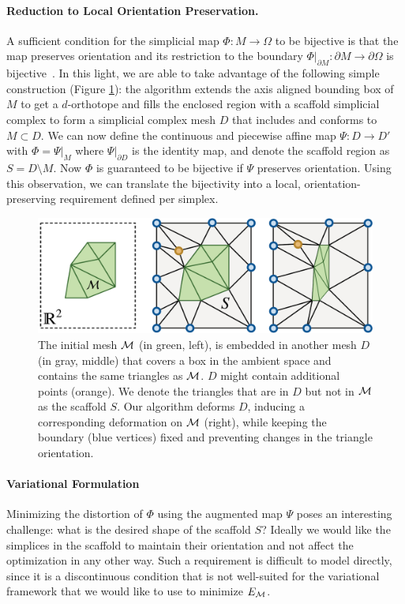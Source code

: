 \paragraph{Reduction to Local Orientation Preservation.}  A sufficient %
condition for the simplicial map 
$\Phi: M\rightarrow \Omega $ to be bijective is that the map preserves orientation and its restriction to the boundary $\Phi|_{\partial M} : \partial M \rightarrow \partial \Omega$ is bijective~\cite{Lipman:2013ArXiv}. In this light, we are able to take advantage of the following simple construction (Figure \ref{scaf:fig:construction}): the algorithm extends the axis aligned bounding box of $M$ to get a $d$-orthotope and fills the enclosed region with a scaffold simplicial complex to form a simplicial complex mesh $D$ that includes and conforms to $M \subset D$. We can now define the continuous and piecewise affine map $\Psi : D \rightarrow D'$ with $\Phi = \Psi |_{M}$ where $\Psi|_{\partial D}$ is the identity map, and denote the scaffold region as $S = D\setminus M$. Now $\Phi$ is guaranteed to be bijective if $\Psi$ preserves orientation. Using this observation, we can translate the bijectivity into a local, orientation-preserving requirement defined per simplex.

\begin{figure}[h!]
\centering
    \includegraphics[width = \columnwidth]{scaf-tex/figs/scaffold_illustration}
\caption{The initial mesh $\operatorname{\mathcal{M}}$ (in green, left), is embedded in another mesh $D$ (in gray, middle) that covers a box in the ambient space and contains the same triangles as $\operatorname{\mathcal{M}}$. $D$ might contain additional points (orange). We denote the triangles that are in $D$ but not in $\operatorname{\mathcal{M}}$ as the scaffold $S$. Our algorithm deforms $D$, inducing a corresponding deformation on $\operatorname{\mathcal{M}}$ (right), while keeping the boundary (blue vertices) fixed and preventing changes in the triangle orientation.}
\label{scaf:fig:construction}
\end{figure}


 \paragraph{Variational Formulation} 
 Minimizing the distortion of $\Phi$ using the augmented map $\Psi$ poses an interesting challenge: what is the desired shape of the scaffold $S$? Ideally we would like the simplices in the scaffold to maintain their orientation and not affect the optimization in any other way. Such a requirement is difficult to model directly, since it is a discontinuous condition that is not well-suited for the variational framework that we would like to use to minimize $E_{\operatorname{\mathcal{M}}}$. 
 
